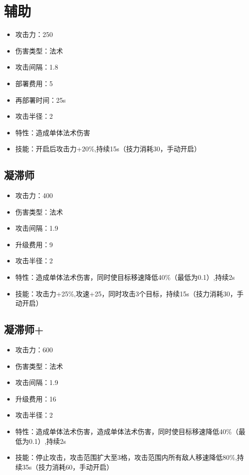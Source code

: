 \documentclass[a4paper,12pt]{article}
\begin{document}
	\section{辅助}
		\begin{itemize}
			\item 攻击力：250
			\item 伤害类型：法术
			\item 攻击间隔：1.8
			\item 部署费用：5
			\item 再部署时间：25s
			\item 攻击半径：2
			\item 特性：造成单体法术伤害
			\item 技能：开启后攻击力+20\%,持续15s（技力消耗30，手动开启）
		\end{itemize}
		\subsection{凝滞师}
			\begin{itemize}
				\item 攻击力：400
				\item 伤害类型：法术
				\item 攻击间隔：1.9
				\item 升级费用：9
				\item 攻击半径：2
				\item 特性：造成单体法术伤害，同时使目标移速降低40\%（最低为0.1）,持续2s
				\item 技能：攻击力+25\%,攻速+25，同时攻击3个目标，持续15s（技力消耗30，手动开启）
			\end{itemize}
		\subsection{凝滞师+}
			\begin{itemize}
				\item 攻击力：600
				\item 伤害类型：法术
				\item 攻击间隔：1.9
				\item 升级费用：16
				\item 攻击半径：2
				\item 特性：造成单体法术伤害，造成单体法术伤害，同时使目标移速降低40\%（最低为0.1）,持续2s
				\item 技能：停止攻击，攻击范围扩大至3格，攻击范围内所有敌人移速降低80\%,持续35s（技力消耗60，手动开启）
			\end{itemize}	
\end{document}
